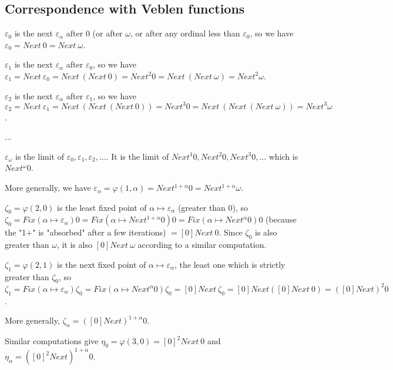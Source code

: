 \documentclass[10pt]{article}
\begin{document}
\subsection{Correspondence with Veblen functions}

\( \varepsilon_0 \) is the next \( \varepsilon_\alpha \) after 0 (or after \( \omega \), or after any ordinal less than \( \varepsilon_0 \), so we have \( \varepsilon_0 = Next\ 0 = Next\ \omega \).

\( \varepsilon_1 \) is the next \( \varepsilon_\alpha \) after \( \varepsilon_0 \), so we have \( \varepsilon_1 = Next\ \varepsilon_0 = Next\ (Next\ 0) = Next^2 0 = Next\ (Next\ \omega) = Next^2 \omega \).

\( \varepsilon_2 \) is the next \( \varepsilon_\alpha \) after \( \varepsilon_1 \), so we have \( \varepsilon_2 = Next\ \varepsilon_1 = Next\ (Next\ (Next\ 0)) = Next^3 0 = Next\ (Next\ (Next\ \omega)) = Next^3 \omega \).

...

\( \varepsilon_\omega \) is the limit of \( \varepsilon_0, \varepsilon_1, \varepsilon_2, \ldots \). It is the limit of \( Next^1 0, Next^2 0, Next^3 0, ... \) which is \( Next^\omega 0 \).

More generally, we have \( \varepsilon_\alpha = \varphi(1,\alpha) = Next^{1+\alpha} 0 = Next^{1+\alpha} \omega \).

\bigskip

\( \zeta_0 = \varphi(2,0) \) is the least fixed point of \( \alpha \mapsto \varepsilon_\alpha \) (greater than 0), so \( \zeta_0 = Fix (\alpha \mapsto \varepsilon_\alpha) 0 = Fix (\alpha \mapsto Next^{1+\alpha} 0) 0 = Fix (\alpha \mapsto Next^\alpha 0) 0 \) (because the "1+" is "absorbed" after a few iterations) \( = [0] Next\ 0 \). Since \( \zeta_0 \) is also greater than \( \omega \), it is also \( [0] Next\ \omega \) according to a similar computation. 

\( \zeta_1 = \varphi(2,1) \) is the next fixed point of \( \alpha \mapsto \varepsilon_\alpha \), the least one which is strictly greater than \( \zeta_0 \), so \( \zeta_1 = Fix (\alpha \mapsto \varepsilon_\alpha) \zeta_0 = Fix (\alpha \mapsto Next^\alpha 0) \zeta_0 = [0] Next\ \zeta_0 = [0] Next ([0] Next\ 0) = ([0] Next)^2 0 \).

More generally, \( \zeta_\alpha = ([0] Next)^{1+\alpha} 0 \).

Similar computations give \( \eta_0 = \varphi(3,0) = [0]^2 Next\ 0 \) and \( \eta_\alpha = ([0]^2 Next)^{1+\alpha} 0 \).
\end{document}
